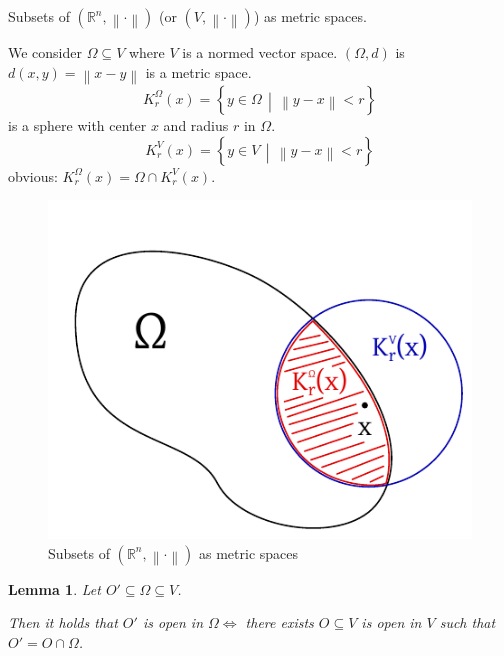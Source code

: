 \documentclass{article}
\newtheorem{lemma}{Lemma}  \numberwithin{lemma}{section}
\newcommand{\setdef}[2]{\left\{\left.#1\,\middle|\,#2\right.\right\}}
\newcommand{\norm}[1]{\left\|#1\right\|}
\begin{document}
Subsets of $(\mathbb R^n, \norm{\cdot})$ (or $(V, \norm{\cdot})$) as metric spaces.

We consider $\Omega \subseteq V$ where $V$ is a normed vector space.
$(\Omega, d)$ is $d(x, y) = \norm{x - y}$ is a metric space.
\[ K_r^\Omega(x) = \setdef{y \in \Omega}{\norm{y - x} < r} \]
is a sphere with center $x$ and radius $r$ in $\Omega$.
\[ K_r^V(x) = \setdef{y \in V}{\norm{y - x} < r} \]
obvious: $K_r^\Omega(x) = \Omega \cap K_r^V(x)$.

\begin{figure}[t]
  \begin{center}
    \includegraphics{img/08.pdf}
    \caption{Subsets of $(\mathbb R^n, \norm{\cdot})$ as metric spaces}
    \label{img:subs}
  \end{center}
\end{figure}

\begin{lemma} %
  Let $O' \subseteq \Omega \subseteq V$.

  Then it holds that $O'$ is open in $\Omega \iff$ there exists $O \subseteq V$ is open in $V$ such that $O' = O \cap \Omega$.
\end{lemma}
\end{document}
